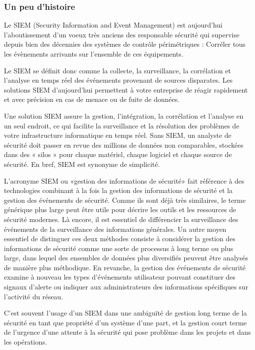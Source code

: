 \subsubsection{Un peu d'histoire}

Le SIEM  (Security Information and Event Management)  est aujourd'hui l'aboutissement d'un voeux  très anciens des responsable sécurité qui supervise depuis bien des décennies des systèmes de contrôle périmétriques : Corréler tous les évènements arrivants sur l'ensemble  de ces équipements. 

Le SIEM se définit donc comme la collecte, la surveillance, la corrélation et l’analyse en temps réel des événements provenant de sources disparates. Les solutions SIEM d’aujourd’hui permettent à votre entreprise de réagir rapidement et avec précision en cas de menace ou de fuite de données.

Une solution SIEM assure la gestion, l’intégration, la corrélation et l’analyse en un seul endroit, ce qui facilite la surveillance et la résolution des problèmes de votre infrastructure informatique en temps réel. Sans SIEM, un analyste de sécurité doit passer en revue des millions de données non comparables, stockées dans des « silos » pour chaque matériel, chaque logiciel et chaque source de sécurité. En bref, SIEM est synonyme de simplicité.

L'acronyme SIEM ou «gestion des informations de sécurité» fait référence à des technologies combinant à la fois la gestion des informations de sécurité et la gestion des événements de sécurité. Comme ils sont déjà très similaires, le terme générique plus large peut être utile pour décrire les outils et les ressources de sécurité modernes. Là encore, il est essentiel de différencier la surveillance des événements de la surveillance des informations générales. Un autre moyen essentiel de distinguer ces deux méthodes consiste à considérer la gestion des informations de sécurité comme une sorte de processus à long terme ou plus large, dans lequel des ensembles de données plus diversifiés peuvent être analysés de manière plus méthodique. En revanche, la gestion des événements de sécurité examine à nouveau les types d’événements utilisateur pouvant constituer des signaux d’alerte ou indiquer aux administrateurs des informations spécifiques sur l’activité du réseau.

C'est souvent l'usage d'un SIEM dans une ambiguïté de gestion long terme de la sécurité en tant que propriété d'un système d'une part, et la gestion court terme de l'urgence d'une attente à la sécurité qui pose problème dans les projets et dans les opérations.
 
